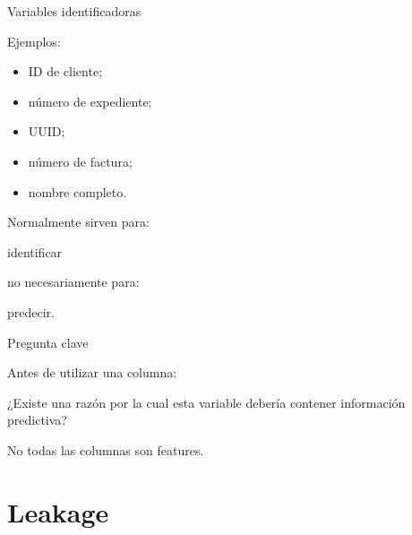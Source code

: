 \documentclass[aspectratio=169,11pt]{beamer}
\begin{document}

\begin{frame}{Variables identificadoras}

Ejemplos:

\begin{itemize}

    \item ID de cliente;

    \item número de expediente;

    \item UUID;

    \item número de factura;

    \item nombre completo.

\end{itemize}

Normalmente sirven para:

\begin{center}

\Large
identificar
\end{center}

no necesariamente para:

\begin{center}

\Large
predecir.
\end{center}

\end{frame}


\begin{frame}{Pregunta clave}

Antes de utilizar una columna:

\begin{center}

\Huge
¿Existe una razón por la cual esta variable
debería contener información predictiva?
\end{center}

\vspace{0.5cm}

No todas las columnas son features.

\end{frame}

\section{Leakage}
\end{document}

